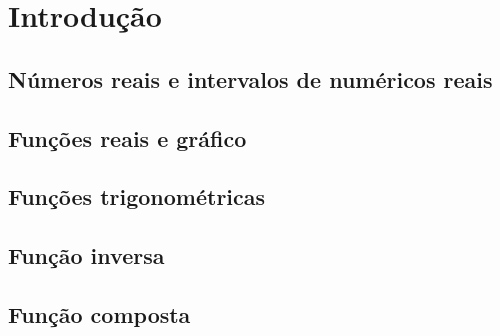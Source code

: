 
\chapter{Introdução}\label{chap:introducao}


\section{Números reais e intervalos de numéricos reais}\label{sec:intro_reais}
\construirSec

\section{Funções reais e gráfico}\label{sec:intro_fun_reais}
\construirSec

\section{Funções trigonométricas}\label{sec:intro_trigo}
\construirSec

\section{Função inversa}\label{sec:intro_inversa}
\construirSec

\section{Função composta}\label{sec:intro_composta}
\construirSec


\emconstrucao